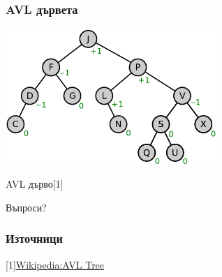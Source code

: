 \documentclass{beamer}
\begin{document}
  \begin{frame}[fragile]
  \frametitle{AVL дървета}
  
  \begin{center}
    \includegraphics[width=8cm]{images/bal_tree_avl}  
  \end{center}
  \centerline{AVL дърво[1]}
  
  \end{frame}
  

\begin{frame}
\centerline{Въпроси?}
\end{frame}

\begin{frame}[fragile]
  \frametitle{Източници}
  
 [1]\href{https://en.wikipedia.org/wiki/AVL_tree}{Wikipedia:AVL Tree}
  
  \end{frame}
\end{document}
